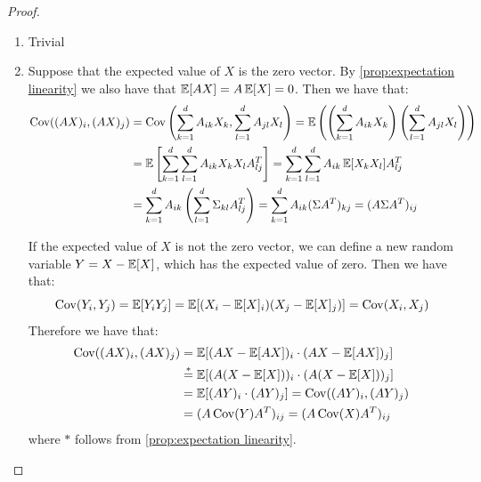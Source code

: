 \begin{proof} \hfill  
    \begin{enumerate}                                                                                                                                        
        \item Trivial
        \item Suppose that the expected value of $X$ is the zero vector. By \ref{prop:expectation linearity} we also have that $\operatorname{\mathbb{E}}[AX] = A \operatorname{\mathbb{E}}[X] = 0$. Then we have that:
              \begin{align*}                                                                                                                                            
                  \operatorname{Cov}((AX)_i, (AX)_j)
                   & = \operatorname{Cov} \left(\sum_{k=1}^{d} A_{ik} X_k, \sum_{l=1}^{d} A_{jl} X_l\right)
                  = \operatorname{\mathbb{E}} \left(\left(\sum_{k=1}^{d} A_{ik} X_k\right)\left(\sum_{l=1}^{d} A_{jl} X_l\right) \right)
                  \\ & = \operatorname{\mathbb{E}} \left[\sum_{k=1}^{d} \sum_{l=1}^{d} A_{ik} X_k X_l A^T_{lj} \right]
                  = \sum_{k=1}^{d} \sum_{l=1}^{d} A_{ik} \operatorname{\mathbb{E}} [X_k X_l] A^T_{lj}
                  \\ & = \sum_{k=1}^{d} A_{ik} \left(\sum_{l=1}^{d} \Sigma_{kl} A^T_{lj} \right)
                  = \sum_{k=1}^{d} A_{ik} (\Sigma A^T)_{kj}
                  = (A \Sigma A^T)_{ij}
              \end{align*}
              
              If the expected value of $X$ is not the zero vector, we can define a new random variable $Y = X - \operatorname{\mathbb{E}}[X]$, which has the expected value of zero. Then we have that:
              \[\operatorname{Cov} (Y_i, Y_j)
                  = \operatorname{\mathbb{E}} [Y_i Y_j]
                  = \operatorname{\mathbb{E}}[(X_i - \operatorname{\mathbb{E}}[X]_i)(X_j - \operatorname{\mathbb{E}}[X]_j)]
                  = \operatorname{Cov} (X_i, X_j)\]
              Therefore we have that:
              \begin{align*}                                                                                                                                    
                  \operatorname{Cov}((AX)_i, (AX)_j)
                   & = \operatorname{\mathbb{E}}[(AX - \operatorname{\mathbb{E}}[AX])_i \cdot (AX - \operatorname{\mathbb{E}}[AX])_j]
                  \\ &\overset{*}{=} \operatorname{\mathbb{E}}[(A(X - \operatorname{\mathbb{E}}[X]))_i \cdot (A(X - \operatorname{\mathbb{E}}[X]))_j]
                  \\ &= \operatorname{\mathbb{E}}[(AY)_i \cdot (AY)_j]
                  = \operatorname{Cov}((AY)_i, (AY)_j) 
                  \\ &= (A \operatorname{Cov}(Y) A^T)_{ij} 
                  = (A \operatorname{Cov}(X) A^T)_{ij}
              \end{align*}
              where $*$ follows from \ref{prop:expectation linearity}.
    \end{enumerate}
\end{proof} 

